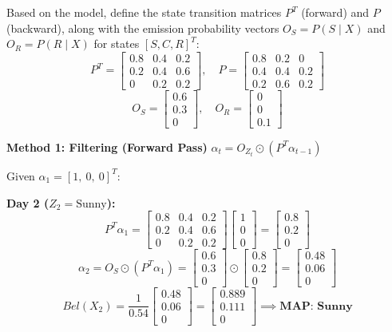 \documentclass{article}
\begin{document}
\begin{enumerate}
    Based on the model, define the state transition matrices $P^T$ (forward) and $P$ (backward), along with the emission probability vectors $O_S = P(S \mid X)$ and $O_R = P(R \mid X)$ for states $[S, C, R]^T$:
    $$ P^T = \begin{bmatrix} 0.8 & 0.4 & 0.2 \\ 0.2 & 0.4 & 0.6 \\ 0 & 0.2 & 0.2 \end{bmatrix}, \quad P = \begin{bmatrix} 0.8 & 0.2 & 0 \\ 0.4 & 0.4 & 0.2 \\ 0.2 & 0.6 & 0.2 \end{bmatrix} $$
    $$ O_S = \begin{bmatrix} 0.6 \\ 0.3 \\ 0 \end{bmatrix}, \quad O_R = \begin{bmatrix} 0 \\ 0 \\ 0.1 \end{bmatrix} $$

    \textbf{Method 1: Filtering (Forward Pass)} \quad $\alpha_t = O_{Z_t} \odot (P^T \alpha_{t-1})$

    Given $\alpha_1 = [1,\ 0,\ 0]^T$:

    \textbf{Day 2 ($Z_2 = \text{Sunny}$):}
    $$ P^T \alpha_1 = \begin{bmatrix} 0.8 & 0.4 & 0.2 \\ 0.2 & 0.4 & 0.6 \\ 0 & 0.2 & 0.2 \end{bmatrix} \begin{bmatrix} 1 \\ 0 \\ 0 \end{bmatrix} = \begin{bmatrix} 0.8 \\ 0.2 \\ 0 \end{bmatrix} $$
    $$ \alpha_2 = O_S \odot (P^T \alpha_1) = \begin{bmatrix} 0.6 \\ 0.3 \\ 0 \end{bmatrix} \odot \begin{bmatrix} 0.8 \\ 0.2 \\ 0 \end{bmatrix} = \begin{bmatrix} 0.48 \\ 0.06 \\ 0 \end{bmatrix} $$
    $$ Bel(X_2) = \frac{1}{0.54} \begin{bmatrix} 0.48 \\ 0.06 \\ 0 \end{bmatrix} = \begin{bmatrix} 0.889 \\ 0.111 \\ 0 \end{bmatrix} \implies \textbf{MAP: Sunny} $$


\end{enumerate}
\end{document}
